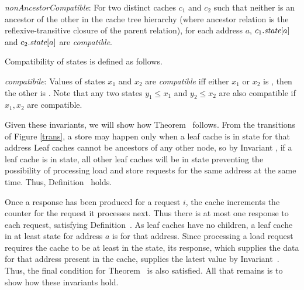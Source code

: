 \begin{inv}
\textit{nonAncestorCompatible}: For two distinct caches $c_1$ and $c_2$ such
that neither is an ancestor of the other in the cache tree
hierarchy (where ancestor relation is the reflexive-transitive closure of the parent relation), for each
address $a$, $c_1.\textit{state}[a]$ and $c_2.\textit{state}[a]$ are \textit{compatible}.
\label{nonAncestorCompatible}
\end{inv}
Compatibility of states is defined as follows.
\begin{defn}
\textit{compatibile}: Values of states $x_1$ and $x_2$ are \textit{compatible} iff
either $x_1$ or $x_2$ is \Mo{}, then the other is \In. Note that any two states $y_1 \le x_1$ and $y_2 \le x_2$ are also compatible if $x_1, x_2$ are compatible.
\label{compatible}
\end{defn}

%

Given these invariants, we will show how Theorem~
follows. From the transitions of Figure \ref{trans}, a store may happen only
when a leaf cache is in \Mo{} state for that
address%
Leaf caches cannot be ancestors of any
other node, so by Invariant , if a leaf cache is
in \Mo{} state, all other leaf caches will be in \In{} state preventing the
possibility of processing load and store requests for the same address at the
same time. Thus, Definition~ holds.

Once a response has been produced for a request $i$, the cache increments the
counter for the request it processes next. Thus there is at most one response
to each request, satisfying Definition~. As leaf caches
have no children, a leaf cache in at least \Sh{} state for address $a$ is
\clean{} for that address. Since processing a load request requires the cache
to be at least in the \Sh{} state, its response, which supplies the data for
that address present in the cache, supplies the latest value by
Invariant~.  Thus, the final condition for
Theorem~ is also satisfied. All that remains is to show
how these invariants hold.

